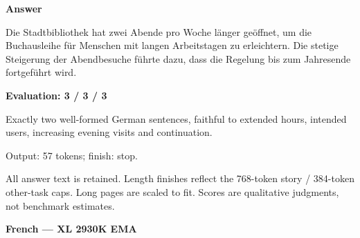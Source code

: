\documentclass[10pt]{article}
\begin{document}
{\begin{minipage}{\textwidth}
\textbf{Answer}\par Die Stadtbibliothek hat zwei Abende pro Woche länger geöffnet, um die Buchausleihe für Menschen mit langen Arbeitstagen zu erleichtern. Die stetige Steigerung der Abendbesuche führte dazu, dass die Regelung bis zum Jahresende fortgeführt wird.\par\smallskip
\textbf{Evaluation: 3 / 3 / 3}\par Exactly two well-formed German sentences, faithful to extended hours, intended users, increasing evening visits and continuation.
\par {\color{gray} Output: 57 tokens; finish: stop.}\par
\medskip\footnotesize All answer text is retained. Length finishes reflect the 768-token story / 384-token other-task caps. Long pages are scaled to fit. Scores are qualitative judgments, not benchmark estimates.
\end{minipage}}%
\noindent\ifdim\dimexpr\ht\languagepage+\dp\languagepage\relax>0.93\textheight%
\resizebox*{!}{0.93\textheight}{\usebox{\languagepage}}%
\else\usebox{\languagepage}\fi%
\clearpage
{\Large\bfseries French --- XL 2930K EMA}\par\smallskip
\end{document}
